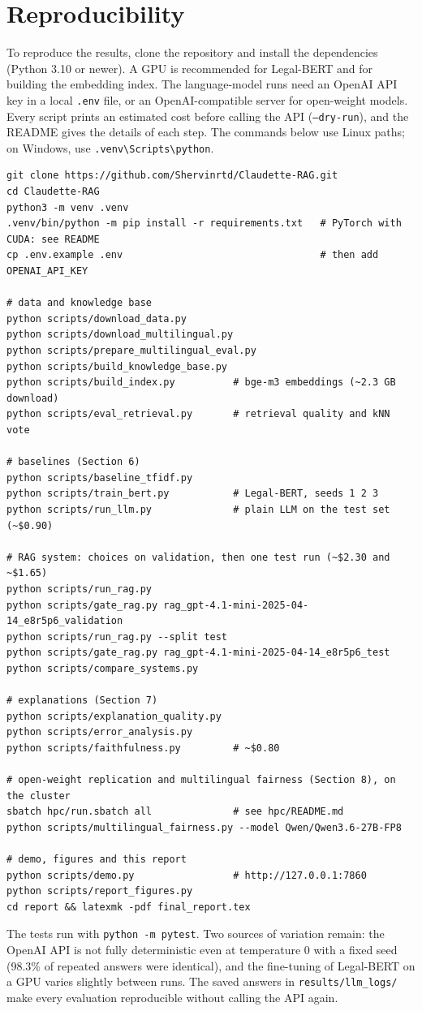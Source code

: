 \section{Reproducibility}
\label{sec:reproducibility}

To reproduce the results, clone the repository and install the dependencies (Python 3.10 or newer). A GPU is recommended for Legal-BERT and for building the embedding index. The language-model runs need an OpenAI API key in a local \texttt{.env} file, or an OpenAI-compatible server for open-weight models. Every script prints an estimated cost before calling the API (\texttt{--dry-run}), and the README gives the details of each step. The commands below use Linux paths; on Windows, use \texttt{.venv\textbackslash Scripts\textbackslash python}.

{\small
\begin{verbatim}
git clone https://github.com/Shervinrtd/Claudette-RAG.git
cd Claudette-RAG
python3 -m venv .venv
.venv/bin/python -m pip install -r requirements.txt   # PyTorch with CUDA: see README
cp .env.example .env                                  # then add OPENAI_API_KEY

# data and knowledge base
python scripts/download_data.py
python scripts/download_multilingual.py
python scripts/prepare_multilingual_eval.py
python scripts/build_knowledge_base.py
python scripts/build_index.py          # bge-m3 embeddings (~2.3 GB download)
python scripts/eval_retrieval.py       # retrieval quality and kNN vote

# baselines (Section 6)
python scripts/baseline_tfidf.py
python scripts/train_bert.py           # Legal-BERT, seeds 1 2 3
python scripts/run_llm.py              # plain LLM on the test set (~$0.90)

# RAG system: choices on validation, then one test run (~$2.30 and ~$1.65)
python scripts/run_rag.py
python scripts/gate_rag.py rag_gpt-4.1-mini-2025-04-14_e8r5p6_validation
python scripts/run_rag.py --split test
python scripts/gate_rag.py rag_gpt-4.1-mini-2025-04-14_e8r5p6_test
python scripts/compare_systems.py

# explanations (Section 7)
python scripts/explanation_quality.py
python scripts/error_analysis.py
python scripts/faithfulness.py         # ~$0.80

# open-weight replication and multilingual fairness (Section 8), on the cluster
sbatch hpc/run.sbatch all              # see hpc/README.md
python scripts/multilingual_fairness.py --model Qwen/Qwen3.6-27B-FP8

# demo, figures and this report
python scripts/demo.py                 # http://127.0.0.1:7860
python scripts/report_figures.py
cd report && latexmk -pdf final_report.tex
\end{verbatim}
}

The tests run with \texttt{python -m pytest}. Two sources of variation remain: the OpenAI API is not fully deterministic even at temperature 0 with a fixed seed (98.3\% of repeated answers were identical), and the fine-tuning of Legal-BERT on a GPU varies slightly between runs. The saved answers in \texttt{results/llm\_logs/} make every evaluation reproducible without calling the API again.
